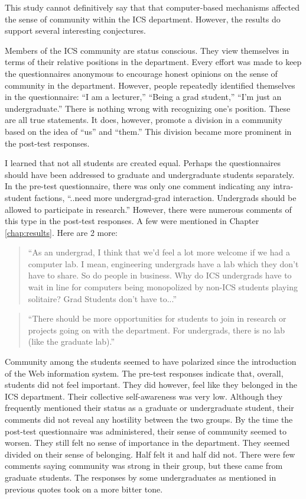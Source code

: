 This study cannot definitively say that that computer-based mechanisms affected
the sense of community within the ICS department.  However, the results do
support several interesting conjectures.

Members of the ICS community are status conscious.  They view themselves in
terms of their relative positions in the department.  Every effort was made to
keep the questionnaires anonymous to encourage honest opinions on the sense of
community in the department.  However, people repeatedly identified themselves
in the questionnaire: ``I am a lecturer,'' ``Being a grad student,'' ``I'm just
an undergraduate.''  There is nothing wrong with recognizing one's position.
These are all true statements.  It does, however, promote a division in a
community based on the idea of ``us'' and ``them.''  This division became more
prominent in the post-test responses.

I learned that not all students are created equal.  Perhaps the questionnaires
should have been addressed to graduate and undergraduate students separately.
In the pre-test questionnaire, there was only one comment indicating any
intra-student factions, ``..need more undergrad-grad interaction.  Undergrads
should be allowed to participate in research.''  However, there were numerous
comments of this type in the post-test responses.  A few were mentioned in
Chapter \ref{chap:results}.  Here are 2 more:

\begin{quote}
  ``As an undergrad, I think that we'd feel a lot more welcome if we had a
  computer lab.  I mean, engineering undergrads have a lab which they don't have
  to share.  So do people in business.  Why do ICS undergrads have to wait in
  line for computers being monopolized by non-ICS students playing solitaire?
  Grad Students don't have to...''
\end{quote}

\begin{quote}
  ``There should be more opportunities for students to join in research or
  projects going on with the department.  For undergrads, there is no lab (like
  the graduate lab).''
\end{quote}

Community among the students seemed to have polarized since the introduction of
the Web information system.  The pre-test responses indicate that, overall,
students did not feel important.  They did however, feel like they belonged in
the ICS department.  Their collective self-awareness was very low.  Although
they frequently mentioned their status as a graduate or undergraduate student,
their comments did not reveal any hostility between the two groups.  By the
time the post-test questionnaire was administered, their sense of community
seemed to worsen.  They still felt no sense of importance in the department.
They seemed divided on their sense of belonging.  Half felt it and half did
not.  There were few comments saying community was strong in their group, but
these came from graduate students.  The responses by some undergraduates as
mentioned in previous quotes took on a more bitter tone.

